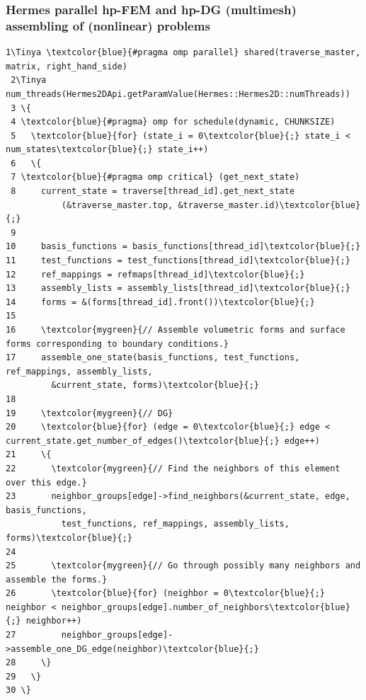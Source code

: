\documentclass{beamer}
\begin{document}
\begin{frame}[fragile]
\frametitle{Hermes parallel hp-FEM and hp-DG (multimesh) assembling of (nonlinear) problems}
\begin{Verbatim}[commandchars=\\\{\}, fontsize=\Tiny]
 1\Tinya \textcolor{blue}{#pragma omp parallel} shared(traverse_master, matrix, right_hand_side)
 2\Tinya num_threads(Hermes2DApi.getParamValue(Hermes::Hermes2D::numThreads))
 3 \{
 4 \textcolor{blue}{#pragma} omp for schedule(dynamic, CHUNKSIZE)
 5   \textcolor{blue}{for} (state_i = 0\textcolor{blue}{;} state_i < num_states\textcolor{blue}{;} state_i++)
 6   \{
 7 \textcolor{blue}{#pragma omp critical} (get_next_state)
 8     current_state = traverse[thread_id].get_next_state
           (&traverse_master.top, &traverse_master.id)\textcolor{blue}{;}
 9
10     basis_functions = basis_functions[thread_id]\textcolor{blue}{;}
11     test_functions = test_functions[thread_id]\textcolor{blue}{;}
12     ref_mappings = refmaps[thread_id]\textcolor{blue}{;}
13     assembly_lists = assembly_lists[thread_id]\textcolor{blue}{;}
14     forms = &(forms[thread_id].front())\textcolor{blue}{;}
15 
16     \textcolor{mygreen}{// Assemble volumetric forms and surface forms corresponding to boundary conditions.}
17     assemble_one_state(basis_functions, test_functions, ref_mappings, assembly_lists,
         &current_state, forms)\textcolor{blue}{;}
18 
19     \textcolor{mygreen}{// DG}
20     \textcolor{blue}{for} (edge = 0\textcolor{blue}{;} edge < current_state.get_number_of_edges()\textcolor{blue}{;} edge++)
21     \{
22       \textcolor{mygreen}{// Find the neighbors of this element over this edge.}
23       neighbor_groups[edge]->find_neighbors(&current_state, edge, basis_functions, 
           test_functions, ref_mappings, assembly_lists, forms)\textcolor{blue}{;}
24       
25       \textcolor{mygreen}{// Go through possibly many neighbors and assemble the forms.}
26       \textcolor{blue}{for} (neighbor = 0\textcolor{blue}{;} neighbor < neighbor_groups[edge].number_of_neighbors\textcolor{blue}{;} neighbor++)
27         neighbor_groups[edge]->assemble_one_DG_edge(neighbor)\textcolor{blue}{;}
28     \}
29   \}
30 \}
\end{Verbatim}
\end{frame}
\end{document}
